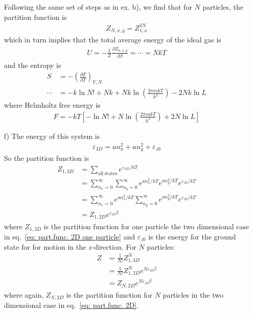 \documentclass[11pt]{article}
\newcounter{excount}
\newenvironment{exercise}[1][]{\addtocounter{excount}{1} \noindent {\bf Exercise
    \arabic{excount} #1}\hspace{2mm}}{\vspace{4mm}}
\begin{document}
\begin{exercise}
\begin{itemize}
			Following the same set of steps as in ex. b), we find that for $N$ particles, the partition function is
			\begin{align}
				Z_{N,x,y} = Z_{1,x}^{2N} \label{eq: part.func. 2D}
			\end{align}
			which in turn implies that the total average energy of the ideal gas is
			\begin{align}
				U = -\frac{1}{Z}\frac{\partial Z_{n,x,y}}{\partial \beta}  = \cdots = NkT \nonumber
			\end{align}
			and the entropy is
			\begin{align}
				S &= -\left( \frac{\partial F}{\partial T} \right) _{V,N} \nonumber \\
				\cdots &= -k\ln N! + Nk + Nk\ln \left( \frac{2\pi mkT}{h^2} \right) - 2Nk\ln L \nonumber
			\end{align}
			where Helmholtz free energy is
			\begin{align}
				F = -kT \left[-\ln N! + N\ln \left( \frac{2\pi mkT}{h^2} \right) + 2N\ln L \right] \nonumber
			\end{align}
		
		\item[f)]
			 The energy of this system is
			 \begin{align}
			 	\varepsilon_{3D} = an_x^2 + an_y^2 + \varepsilon_{z0} \nonumber
			 \end{align}
			 So the partition function is
			 \begin{align}
			 	Z_{1,3D} 	&= \sum_{\mathrm{all~states}} e^{\varepsilon_{3D}/kT} \nonumber \\
			 		&= \sum_{n_x=0}^\infty \sum_{n_y=0}^{\infty} e^{an_x^2/kT}e^{an_y^2/kT}e^{\varepsilon_{z0}/kT} \nonumber \\
			 		&= \sum_{n_x=0}^\infty e^{an_x^2/kT} \sum_{n_y=0}^{\infty} e^{an_y^2/kT} e^{\varepsilon_{z0}/kT} \nonumber \\
			 		&= Z_{1,2D} e^{\varepsilon_{z0}\beta} \nonumber
			 \end{align}
			 where $Z_{1,2D}$ is the partition function for one particle the two dimensional case in eq.~\ref{eq: part.func. 2D one particle} and $\varepsilon_{z0}$ is the energy for the ground state for for motion in the $z$-direction.
			 For $N$ particles:
			 \begin{align}
			 	Z 	&= \frac{1}{N!}Z_{1,3D}^N \nonumber \\
			 		&= \frac{1}{N!}Z_{1,2D}^N e^{N\varepsilon_{z0}\beta} \nonumber \\
			 		&= Z_{N,2D} e^{N\varepsilon_{z0}\beta} \nonumber
			 \end{align}
			 where again, $Z_{N,2D}$ is the partition function for $N$ particles in the two dimensional case in eq.~\ref{eq: part.func. 2D}. 
			

\end{itemize}
\end{exercise}
\end{document}
